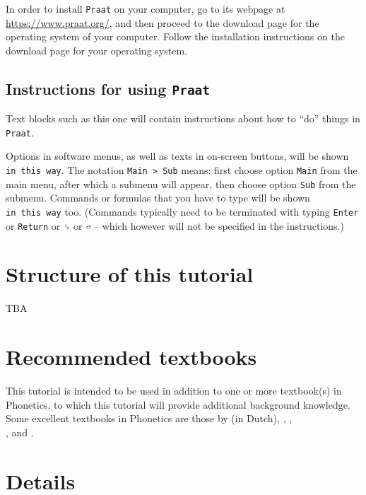 \documentclass[
]{book}
\begin{document}
In order to install \texttt{Praat} on your computer, go to its webpage at \url{https://www.praat.org/}, and then proceed to the download page for the operating system of your computer. Follow the installation instructions on the download page for your operating system.

\label{tech-layout}
\subsection*{\texorpdfstring{Instructions for using \texttt{Praat}}{Instructions for using Praat}}\label{instructions-for-using-praat}

Text blocks such as this one will contain instructions about how to ``do'' things in \texttt{Praat}.

Options in software menus, as well as texts in on-screen buttons, will be shown \texttt{in\ this\ way}.
The notation \texttt{Main\ \textgreater{}\ Sub} means: first choose option \texttt{Main} from the main menu, after which a submenu will appear, then choose option \texttt{Sub} from the submenu.
Commands or formulas that you have to type will be shown \texttt{in\ this\ way} too. (Commands typically need to be terminated with typing \texttt{Enter} or \texttt{Return} or \texttt{␍} or \texttt{⏎} -- which however will not be specified in the instructions.)

\section*{Structure of this tutorial}\label{structure-of-this-tutorial}

TBA

\section{Recommended textbooks}\label{sec:textbooks}

This tutorial is intended to be used in addition to one or more textbook(s) in Phonetics, to which this tutorial will provide additional background knowledge. Some excellent textbooks in Phonetics are those by
\citet{Rietveld_VanHeuven_2009} (in Dutch),
\citet{Johnson_2012},
\citet{Ladefoged_Johnson_2015},\\
\citet{Reetz_Jongman_2020}, and
\citet{Zsiga_2024}.

\section*{Details}\label{details}
\end{document}
